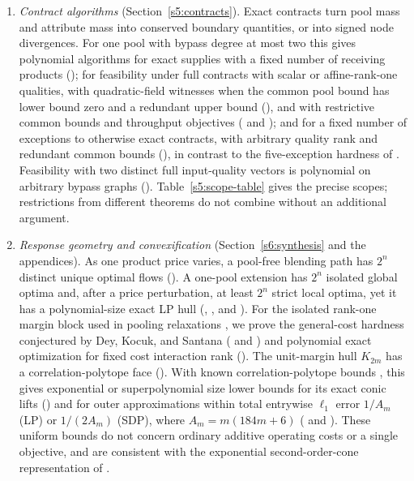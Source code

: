 \begin{enumerate}[label=(\arabic*),leftmargin=*]
\item \emph{Contract algorithms} (Section~\ref{s5:contracts}). Exact
contracts turn pool mass and attribute mass into conserved boundary
quantities, or into signed node divergences. For one pool with bypass
degree at most two this gives polynomial algorithms for exact supplies
with a fixed number of receiving products ();
for feasibility under full contracts with scalar or affine-rank-one
qualities, with quadratic-field witnesses when the common pool bound has
lower bound zero and a redundant upper bound (),
and with restrictive common bounds and throughput objectives
( and );
and for a fixed number of exceptions to otherwise exact contracts, with
arbitrary quality rank and redundant common bounds
(), in contrast to the five-exception
hardness of . Feasibility with two distinct full
input-quality vectors is polynomial on arbitrary bypass graphs
(). Table~\ref{s5:scope-table} gives the
precise scopes; restrictions from different theorems do not combine
without an additional argument.

\item \emph{Response geometry and convexification}
(Section~\ref{s6:synthesis} and the appendices). As one product price
varies, a pool-free blending path has $2^n$ distinct unique optimal
flows (). A one-pool extension has $2^n$
isolated global optima and, after a price perturbation, at least $2^n$
strict local optima, yet it has a polynomial-size exact LP hull
(, , and ). For the isolated
rank-one margin block used in pooling relaxations
\citep{dey2020-convexifications-of-rank-one-based}, we prove the
general-cost hardness conjectured by Dey, Kocuk, and Santana
( and ) and polynomial
exact optimization for fixed cost interaction rank
(). The unit-margin hull $K_{2m}$ has a
correlation-polytope face (). With known
correlation-polytope bounds \citep{s6:fawzi2013,s6:lrs-full,s6:bfps2015},
this gives exponential or superpolynomial size lower bounds for its
exact conic lifts () and for outer approximations
within total entrywise $\ell_1$ error $1/A_m$ (LP) or $1/(2A_m)$ (SDP),
where $A_m=m(184m+6)$ ( and ).
These uniform bounds do not concern ordinary additive operating costs or
a single objective, and are consistent with the exponential
second-order-cone representation of \citet{s6:jalilian2026}.


\end{enumerate}
